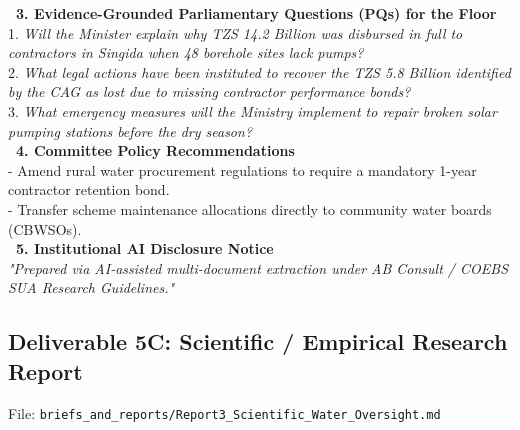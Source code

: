 \documentclass[11pt, a4paper]{report}
\begin{document}
\begin{tcolorbox}[colback=lightgrey, colframe=bordergrey, title=\textbf{Deliverable 5B Preview: \texttt{Report2\_Policy\_Brief\_Water\_Oversight.md}}]
\textcolor{tanzaniablue}{\textbf{\ 3. Evidence-Grounded Parliamentary Questions (PQs) for the Floor}}\\
1. \textit{Will the Minister explain why TZS 14.2 Billion was disbursed in full to contractors in Singida when 48 borehole sites lack pumps?}\\
2. \textit{What legal actions have been instituted to recover the TZS 5.8 Billion identified by the CAG as lost due to missing contractor performance bonds?}\\
3. \textit{What emergency measures will the Ministry implement to repair broken solar pumping stations before the dry season?}\\[0.2cm]
\textcolor{tanzaniablue}{\textbf{\ 4. Committee Policy Recommendations}}\\
- Amend rural water procurement regulations to require a mandatory 1-year contractor retention bond.\\
- Transfer scheme maintenance allocations directly to community water boards (CBWSOs).\\[0.2cm]
\textcolor{tanzaniablue}{\textbf{\ 5. Institutional AI Disclosure Notice}}\\
\textit{"Prepared via AI-assisted multi-document extraction under AB Consult / COEBS SUA Research Guidelines."}
\end{tcolorbox}

\newpage

\subsection{Deliverable 5C: Scientific / Empirical Research Report}
File: \texttt{briefs\_and\_reports/Report3\_Scientific\_Water\_Oversight.md}
\end{document}
